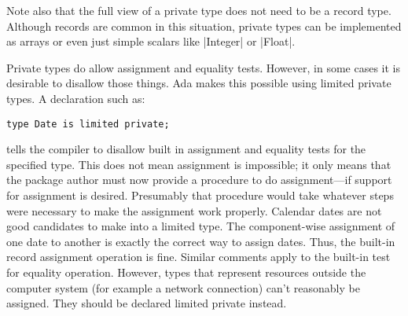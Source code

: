 Note also that the full view of a private type does not need to be a record type. Although
records are common in this situation, private types can be implemented as arrays or even just
simple scalars like |Integer| or |Float|.

Private types do allow assignment and equality tests. However, in some cases it is desirable to
disallow those things. Ada makes this possible using limited private types. A declaration such
as:

\begin{lstlisting}
type Date is limited private;
\end{lstlisting}

\noindent tells the compiler to disallow built in assignment and equality tests for the
specified type. This does not mean assignment is impossible; it only means that the package
author must now provide a procedure to do assignment---if support for assignment is desired.
Presumably that procedure would take whatever steps were necessary to make the assignment work
properly. Calendar dates are not good candidates to make into a limited type. The component-wise
assignment of one date to another is exactly the correct way to assign dates. Thus, the built-in
record assignment operation is fine. Similar comments apply to the built-in test for equality
operation. However, types that represent resources outside the computer system (for example a
network connection) can't reasonably be assigned. They should be declared limited private
instead.

